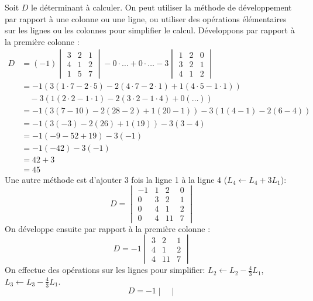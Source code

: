 \begin{solution}
Soit $D$ le déterminant à calculer. On peut utiliser la méthode de développement par rapport à une colonne ou une ligne, ou utiliser des opérations élémentaires sur les lignes ou les colonnes pour simplifier le calcul.
Développons par rapport à la première colonne :
\begin{align*} D &= (-1) \begin{vmatrix} 3 & 2 & 1 \\ 4 & 1 & 2 \\ 1 & 5 & 7 \end{vmatrix} - 0 \cdot \dots + 0 \cdot \dots - 3 \begin{vmatrix} 1 & 2 & 0 \\ 3 & 2 & 1 \\ 4 & 1 & 2 \end{vmatrix} \\ &= -1 \left( 3(1 \cdot 7 - 2 \cdot 5) - 2(4 \cdot 7 - 2 \cdot 1) + 1(4 \cdot 5 - 1 \cdot 1) \right) \\ & \quad - 3 \left( 1(2 \cdot 2 - 1 \cdot 1) - 2(3 \cdot 2 - 1 \cdot 4) + 0(\dots) \right) \\ &= -1 \left( 3(7 - 10) - 2(28 - 2) + 1(20 - 1) \right) - 3 \left( 1(4 - 1) - 2(6 - 4) \right) \\ &= -1 \left( 3(-3) - 2(26) + 1(19) \right) - 3 \left( 3 - 4 \right) \\ &= -1 \left( -9 - 52 + 19 \right) - 3 \left( -1 \right) \\ &= -1 (-42) - 3 (-1) \\ &= 42 + 3 \\ &= 45 \end{align*}
Une autre méthode est d'ajouter 3 fois la ligne 1 à la ligne 4 ($L_4 \leftarrow L_4 + 3L_1$):
\[
D = \begin{vmatrix}
-1 & 1 & 2 & 0 \\
0 & 3 & 2 & 1 \\
0 & 4 & 1 & 2 \\
0 & 4 & 11 & 7
\end{vmatrix}
\]
On développe ensuite par rapport à la première colonne :
\[
D = -1 \begin{vmatrix}
3 & 2 & 1 \\
4 & 1 & 2 \\
4 & 11 & 7
\end{vmatrix}
\]
On effectue des opérations sur les lignes pour simplifier: $L_2 \leftarrow L_2 - \frac{4}{3} L_1$, $L_3 \leftarrow L_3 - \frac{4}{3} L_1$.
\[
D = -1 \begin{vmatrix}

\end{vmatrix}\]
\end{solution}
